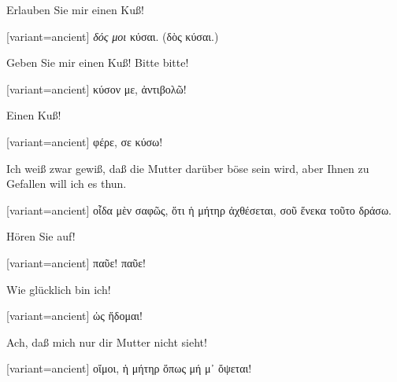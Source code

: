 Erlauben Sie mir einen Kuß! 

\switchcolumn

\begin{greek}[variant=ancient]%
\emph{δός μοι} κύσαι. (δὸς κύσαι.)

\end{greek}%
\switchcolumn*

Geben Sie mir einen Kuß! Bitte bitte! 

\switchcolumn

\begin{greek}[variant=ancient]%
κύσον με, ἀντιβολῶ!

\end{greek}%
\switchcolumn*

Einen Kuß! 

\switchcolumn

\begin{greek}[variant=ancient]%
φέρε, σε κύσω!

\end{greek}%
\switchcolumn*

Ich weiß zwar gewiß, daß die Mutter darüber böse sein wird, aber Ihnen
zu Gefallen will ich es thun. 

\switchcolumn

\begin{greek}[variant=ancient]%
οἶδα μὲν σαφῶς, ὅτι ἡ μήτηρ ἀχθέσεται, σοῦ ἕνεκα τοῦτο δράσω.

\end{greek}%
\switchcolumn*

Hören Sie auf! 

\switchcolumn

\begin{greek}[variant=ancient]%
παῦε! παῦε!

\end{greek}%
\switchcolumn*

Wie glücklich bin ich! 

\switchcolumn

\begin{greek}[variant=ancient]%
ὡς ἥδομαι!

\end{greek}%
\switchcolumn*

Ach, daß mich nur dir Mutter nicht sieht! 

\switchcolumn

\begin{greek}[variant=ancient]%
οἴμοι, ἡ μήτηρ ὅπως μή μ᾽ ὄψεται!

\end{greek}%
\switchcolumn*

